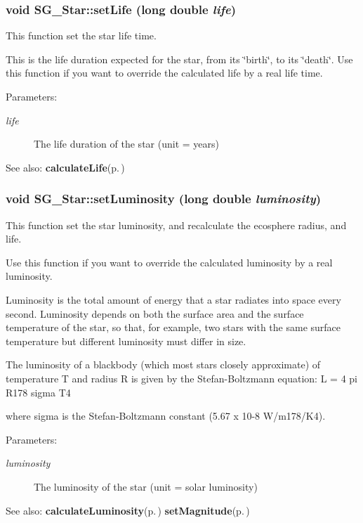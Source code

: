 \subsubsection{\setlength{\rightskip}{0pt plus 5cm}void SG\_\-Star::set\-Life (long double {\em life})}\label{class_s_g___star_a6}


This function set the star life time. 

This is the life duration expected for the star, from its \char`\"{}birth\char`\"{}, to its \char`\"{}death\char`\"{}. Use this function if you want to override the calculated life by a real life time. \begin{Desc}
\item[Parameters:]
\begin{description}
\item[{\em life}]The life duration of the star (unit = years) \end{description}
\end{Desc}
\begin{Desc}
\item[See also:]{\bf calculate\-Life}{\rm (p.\,\pageref{class_s_g___star_b2})} \end{Desc}
\subsubsection{\setlength{\rightskip}{0pt plus 5cm}void SG\_\-Star::set\-Luminosity (long double {\em luminosity})}\label{class_s_g___star_a4}


This function set the star luminosity, and recalculate the ecosphere radius, and life. 

Use this function if you want to override the calculated luminosity by a real luminosity.

Luminosity is the total amount of energy that a star radiates into space every second. Luminosity depends on both the surface area and the surface temperature of the star, so that, for example, two stars with the same surface temperature but different luminosity must differ in size.

The luminosity of a blackbody (which most stars closely approximate) of temperature T and radius R is given by the Stefan-Boltzmann equation: L = 4 pi R178 sigma T4

where sigma is the Stefan-Boltzmann constant (5.67 x 10-8 W/m178/K4).

\begin{Desc}
\item[Parameters:]
\begin{description}
\item[{\em luminosity}]The luminosity of the star (unit = solar luminosity) \end{description}
\end{Desc}
\begin{Desc}
\item[See also:]{\bf calculate\-Luminosity}{\rm (p.\,\pageref{class_s_g___star_b0})} {\bf set\-Magnitude}{\rm (p.\,\pageref{class_s_g___star_a8})} \end{Desc}
